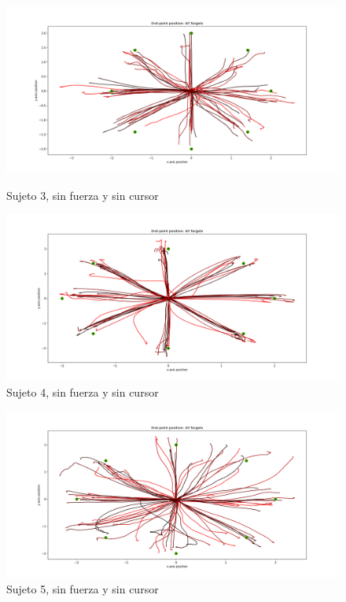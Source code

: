\documentclass[a4paper,11pt, oneside]{book}
\begin{document}
\begin{figure}[h]
	\begin{minipage}[b]{0.5\linewidth}
		\centering
		\includegraphics[width=\linewidth]{sujeto3/no_force_no_cursor/trayectorias}
		\caption{Sujeto 3, sin fuerza y sin cursor}
		\label{fig:figura1}
	\end{minipage}
	\hspace{0.5cm}
	\begin{minipage}[b]{0.5\linewidth}
		\centering
		\includegraphics[width=\linewidth]{sujeto4/no_force_no_cursor/trayectorias}
		\caption{Sujeto 4, sin fuerza y sin cursor}
		\label{fig:figura2}
	\end{minipage}
\end{figure}
\begin{figure}[H]
	\begin{minipage}[b]{0.5\linewidth}
		\centering
		\includegraphics[width=\linewidth]{sujeto5/no_force_no_cursor/trayectorias}
		\caption{Sujeto 5, sin fuerza y sin cursor}
		\label{fig:figura1}
	\end{minipage}
\end{figure}
\end{document}
